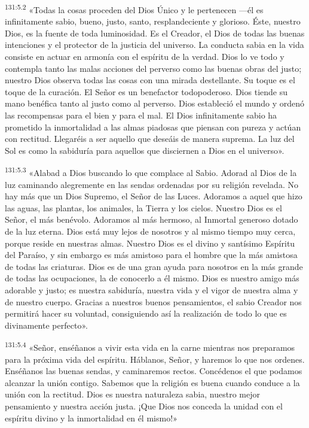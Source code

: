 \par 
\textsuperscript{131:5.2} «Todas la cosas proceden del Dios Único y le pertenecen ---él es infinitamente sabio, bueno, justo, santo, resplandeciente y glorioso. Éste, nuestro Dios, es la fuente de toda luminosidad. Es el Creador, el Dios de todas las buenas intenciones y el protector de la justicia del universo. La conducta sabia en la vida consiste en actuar en armonía con el espíritu de la verdad. Dios lo ve todo y contempla tanto las malas acciones del perverso como las buenas obras del justo; nuestro Dios observa todas las cosas con una mirada destellante. Su toque es el toque de la curación. El Señor es un benefactor todopoderoso. Dios tiende su mano benéfica tanto al justo como al perverso. Dios estableció el mundo y ordenó las recompensas para el bien y para el mal. El Dios infinitamente sabio ha prometido la inmortalidad a las almas piadosas que piensan con pureza y actúan con rectitud. Llegaréis a ser aquello que deseáis de manera suprema. La luz del Sol es como la sabiduría para aquellos que disciernen a Dios en el universo».

\par 
\textsuperscript{131:5.3} «Alabad a Dios buscando lo que complace al Sabio. Adorad al Dios de la luz caminando alegremente en las sendas ordenadas por su religión revelada. No hay más que un Dios Supremo, el Señor de las Luces. Adoramos a aquel que hizo las aguas, las plantas, los animales, la Tierra y los cielos. Nuestro Dios es el Señor, el más benévolo. Adoramos al más hermoso, al Inmortal generoso dotado de la luz eterna. Dios está muy lejos de nosotros y al mismo tiempo muy cerca, porque reside en nuestras almas. Nuestro Dios es el divino y santísimo Espíritu del Paraíso, y sin embargo es más amistoso para el hombre que la más amistosa de todas las criaturas. Dios es de una gran ayuda para nosotros en la más grande de todas las ocupaciones, la de conocerlo a él mismo. Dios es nuestro amigo más adorable y justo; es nuestra sabiduría, nuestra vida y el vigor de nuestra alma y de nuestro cuerpo. Gracias a nuestros buenos pensamientos, el sabio Creador nos permitirá hacer su voluntad, consiguiendo así la realización de todo lo que es divinamente perfecto».

\par 
\textsuperscript{131:5.4} «Señor, enséñanos a vivir esta vida en la carne mientras nos preparamos para la próxima vida del espíritu. Háblanos, Señor, y haremos lo que nos ordenes. Enséñanos las buenas sendas, y caminaremos rectos. Concédenos el que podamos alcanzar la unión contigo. Sabemos que la religión es buena cuando conduce a la unión con la rectitud. Dios es nuestra naturaleza sabia, nuestro mejor pensamiento y nuestra acción justa. ¡Que Dios nos conceda la unidad con el espíritu divino y la inmortalidad en él mismo!»

